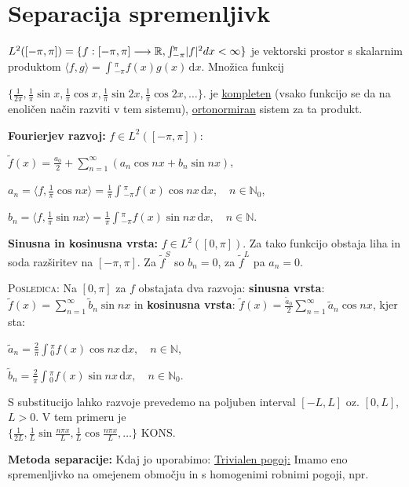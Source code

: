 \documentclass[10pt,a4paper]{amsart}
\theoremstyle{definition} %
\theoremstyle{plain} %
\newcommand{\dx}{\ensuremath{\,\mathrm{d}x}}
\let\oldint\int
\renewcommand{\int}{\oldint \!}
\newcommand{\R}{\mathbb R}
\newcommand{\N}{\mathbb N}
\begin{document}



\section*{Separacija spremenljivk}

$L^2([-\pi,\pi]) = \{f:[-\pi,\pi]\longrightarrow \R, \int_{-\pi}^\pi |f|^2
\\dx < \infty \}$ je vektorski prostor s skalarnim produktom $\langle f, g\rangle =
\int_{-\pi}^\pi f(x)g(x)\dx$. Množica funkcij

  $\{\frac{1}{2\pi},
  \frac{1}{\pi}\sin{x},\frac{1}{\pi}\cos{x},\frac{1}{\pi}\sin{2x},\frac{1}{\pi}\cos{2x},\ldots
\}$. je \underline{kompleten} (vsako funkcijo se da na enoličen način razviti v
tem sistemu),  \underline{ortonormiran} sistem za ta produkt.

\textbf{Fourierjev razvoj:} $f \in L^2([-\pi,\pi])$:

$\tilde{f}(x) = \frac{a_0}{2} + \sum_{n=1}^{\infty}(a_n\cos{nx} + b_n\sin{nx})$,

$a_n = \langle f,\frac{1}{\pi}\cos{nx} \rangle =
\frac{1}{\pi}\int_{-\pi}^{\pi}f(x)\cos{nx}\dx, \quad n \in \N_0$,

$b_n = \langle f,\frac{1}{\pi}\sin{nx} \rangle =
\frac{1}{\pi}\int_{-\pi}^{\pi}f(x)\sin{nx}\dx, \quad n \in \N$.

\textbf{Sinusna in kosinusna vrsta:} $f \in L^2([0,\pi])$. Za tako funkcijo
obstaja liha in soda razširitev na $[-\pi,\pi]$. Za $\tilde{f}^S$ so $b_n = 0$,
za $\tilde{f}^L$ pa $a_n = 0$.

\textsc{Posledica:} Na $[0,\pi]$ za $f$ obstajata dva razvoja: \textbf{sinusna
vrsta}: $\tilde{f}(x) =  \sum_{n=1}^{\infty} \tilde{b}_n\sin{nx}$ in
\textbf{kosinusna vrsta}:  $\tilde{f}(x) =
\frac{\tilde{a}_0}{2}\sum_{n=1}^{\infty}\tilde{a}_n\cos{nx}$, kjer sta:

$\tilde{a}_n = \frac{2}{\pi}\int_0^{\pi}f(x)\cos{nx}\dx, \quad n \in \N$,

$\tilde{b}_n = \frac{2}{\pi}\int_0^{\pi}f(x)\sin{nx}\dx, \quad n \in \N_0$.

S substitucijo lahko razvoje prevedemo na poljuben interval $[-L,L]$ oz.
$[0,L]$, $L > 0$. V tem primeru je \\ $\{\frac{1}{2L}, \frac{1}{L}\sin{\frac{n\pi
x}{L}},\frac{1}{L}\cos{\frac{n\pi x}{L}},\ldots \}$ KONS.


\textbf{Metoda separacije:} Kdaj jo uporabimo: \underline{Trivialen pogoj:}
Imamo eno spremenljivko na omejenem območju in s homogenimi robnimi pogoji, npr.
\end{document}
